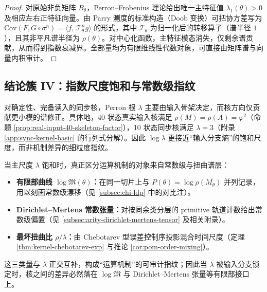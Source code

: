 \begin{proof}
对原始非负矩阵 $B_\theta$，Perron--Frobenius 理论给出唯一主特征值 $\lambda_1(\theta)>0$ 及相应左右正特征向量。由 Parry 测度的标准构造（Doob 变换）可把协方差写为
\(
\mathrm{Cov}(F,G\circ\sigma^n)=\langle f,\,\mathcal{T}_\theta^n g\rangle
\)
的形式，其中 $\mathcal{T}_\theta$ 为归一化后的转移算子（谱半径 $1$），且其非平凡谱半径为 $\rho(\theta)$。对中心化函数，主特征模态消失，仅剩余谱贡献，从而得到指数衰减界。全部量均为有限维线性代数对象，可直接由矩阵谱与向量内积审计。
\end{proof}



\subsection{结论簇 IV：指数尺度饱和与常数级指纹}\label{subsec:pom-lambda-saturation}
\begin{proposition}[指数尺度的输入饱和]\label{prop:pom-lambda-saturation}
对确定性、完备读入的同步核，Perron 根 $\lambda$ 主要由输入骨架决定，而核方向仅贡献更小模的谱修正。具体地，40 状态真实输入核满足 $\rho(M)=\rho(A)=\varphi^2$（命题 \ref{prop:real-input-40-skeleton-factor}），10 状态同步核满足 $\lambda=3$（附录 \ref{app:sync-kernel-basic} 的行列式分解）。因此 $\log\lambda$ 更接近“输入分支熵”的饱和尺度，而非机制差异的细粒度指纹。
\end{proposition}

\begin{remark}[区分机制的三类指纹]\label{rem:pom-mechanism-fingerprint}
当主尺度 $\lambda$ 饱和时，真正区分运算机制的对象来自常数级与扭曲谱层：
\begin{itemize}
  \item \textbf{有限部曲线 $\log\mathfrak{M}(\theta)$：}在同一切片上与 $P(\theta)=\log\rho(M_\theta)$ 并列记录，用以刻画常数级漂移（见 \ref{subsec:chi-ldp} 中的对比注）。
  \item \textbf{Dirichlet--Mertens 常数张量：}对按同余类分层的 primitive 轨道计数给出常数级偏置（见 \ref{subsec:arity-dirichlet-mertens-tensor} 及相关附录）。
  \item \textbf{最坏扭曲比 $\rho/\lambda$：}由 Chebotarev 型误差控制序投影混合时间尺度（定理 \ref{thm:kernel-chebotarev-exp} 与推论 \ref{cor:pom-order-mixing}）。
\end{itemize}
这三类量与 $\lambda$ 正交互补，构成“运算机制”的可审计指纹；因此当 $\lambda$ 被输入分支锁定时，核之间的差异必然落在 $\log\mathfrak{M}$ 与 Dirichlet--Mertens 张量等有限部接口上。
\end{remark}

